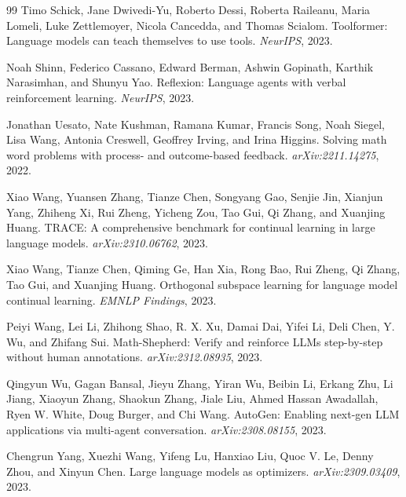 \documentclass{article}
\begin{document}
\begin{thebibliography}{99}
Timo Schick, Jane Dwivedi-Yu, Roberto Dessi, Roberta Raileanu, Maria Lomeli, Luke Zettlemoyer, Nicola Cancedda, and Thomas Scialom.
\newblock Toolformer: Language models can teach themselves to use tools.
\newblock \emph{NeurIPS}, 2023.

Noah Shinn, Federico Cassano, Edward Berman, Ashwin Gopinath, Karthik Narasimhan, and Shunyu Yao.
\newblock Reflexion: Language agents with verbal reinforcement learning.
\newblock \emph{NeurIPS}, 2023.

Jonathan Uesato, Nate Kushman, Ramana Kumar, Francis Song, Noah Siegel, Lisa Wang, Antonia Creswell, Geoffrey Irving, and Irina Higgins.
\newblock Solving math word problems with process- and outcome-based feedback.
\newblock \emph{arXiv:2211.14275}, 2022.

Xiao Wang, Yuansen Zhang, Tianze Chen, Songyang Gao, Senjie Jin, Xianjun Yang, Zhiheng Xi, Rui Zheng, Yicheng Zou, Tao Gui, Qi Zhang, and Xuanjing Huang.
\newblock TRACE: A comprehensive benchmark for continual learning in large language models.
\newblock \emph{arXiv:2310.06762}, 2023.

Xiao Wang, Tianze Chen, Qiming Ge, Han Xia, Rong Bao, Rui Zheng, Qi Zhang, Tao Gui, and Xuanjing Huang.
\newblock Orthogonal subspace learning for language model continual learning.
\newblock \emph{EMNLP Findings}, 2023.

Peiyi Wang, Lei Li, Zhihong Shao, R. X. Xu, Damai Dai, Yifei Li, Deli Chen, Y. Wu, and Zhifang Sui.
\newblock Math-Shepherd: Verify and reinforce LLMs step-by-step without human annotations.
\newblock \emph{arXiv:2312.08935}, 2023.

Qingyun Wu, Gagan Bansal, Jieyu Zhang, Yiran Wu, Beibin Li, Erkang Zhu, Li Jiang, Xiaoyun Zhang, Shaokun Zhang, Jiale Liu, Ahmed Hassan Awadallah, Ryen W. White, Doug Burger, and Chi Wang.
\newblock AutoGen: Enabling next-gen LLM applications via multi-agent conversation.
\newblock \emph{arXiv:2308.08155}, 2023.

Chengrun Yang, Xuezhi Wang, Yifeng Lu, Hanxiao Liu, Quoc V. Le, Denny Zhou, and Xinyun Chen.
\newblock Large language models as optimizers.
\newblock \emph{arXiv:2309.03409}, 2023.


\end{thebibliography}
\end{document}
